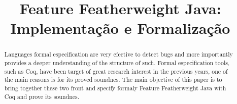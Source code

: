 \documentclass[bacharelado]{unb-cic}
\title{Feature Featherweight Java: Implementação e Formalização}
\theoremstyle{definition}
\theoremstyle{definition}
\begin{document}
  \maketitle
  \pretextual




  \begin{abstract}
  Languages formal especification are very efective to detect bugs and more importantly provides a deeper understanding of the structure of such. Formal especification tools, such as Coq, have been target of great research interest in the previous years, one of the main reasons is for its proved soundnes. The main objective of this paper is to bring together these two front and specify formaly Feature Featherweight Java with Coq and prove its soundnes.
  \end{abstract}

  \tableofcontents

  \textual
  
  

  \postextual
  
  
\end{document}
